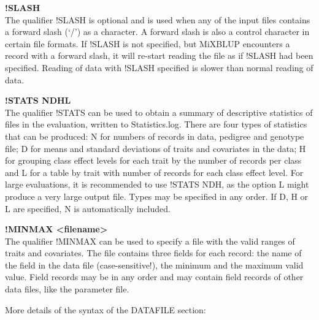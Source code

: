 \textbf{!SLASH}\\
The qualifier !SLASH is optional and is used when any of the input files
contains a forward slash (`/') as a character. A forward slash is also a
control character in certain file formats. If !SLASH is not specified,
but MiXBLUP encounters a record with a forward slash, it will re-start
reading the file as if !SLASH had been specified. Reading of data with
!SLASH specified is slower than normal reading of data.

\textbf{!STATS NDHL}\\
The qualifier !STATS can be used to obtain a summary of descriptive
statistics of files in the evaluation, written to Statistics.log. There
are four types of statistics that can be produced: N for numbers of
records in data, pedigree and genotype file; D for means and standard
deviations of traits and covariates in the data; H for grouping class
effect levels for each trait by the number of records per class and L
for a table by trait with number of records for each class effect level.
For large evaluations, it is recommended to use !STATS NDH, as the
option L might produce a very large output file. Types may be specified
in any order. If D, H or L are specified, N is automatically included.

\textbf{!MINMAX \textless filename\textgreater{}}\\
The qualifier !MINMAX can be used to specify a file with the valid
ranges of traits and covariates. The file contains three fields for each
record: the name of the field in the data file (case-sensitive!), the
minimum and the maximum valid value. Field records may be in any order
and may contain field records of other data files, like the parameter
file.

More details of the syntax of the DATAFILE section:

